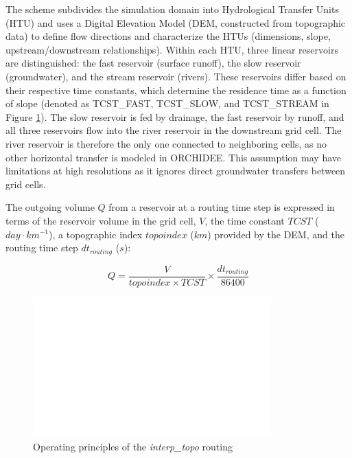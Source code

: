 The scheme subdivides the simulation domain into Hydrological Transfer Units (HTU) and uses a Digital Elevation Model (DEM, constructed from topographic data) to define flow directions and characterize the HTUs (dimensions, slope, upstream/downstream relationships).
Within each HTU, three linear reservoirs are distinguished: the fast reservoir (surface runoff), the slow reservoir (groundwater), and the stream reservoir (rivers). These reservoirs differ based on their respective time constants, which determine the residence time as a function of slope (denoted as TCST\_FAST, TCST\_SLOW, and TCST\_STREAM in Figure \ref{fig:routing_principles}).
The slow reservoir is fed by drainage, the fast reservoir by runoff, and all three reservoirs flow into the river reservoir in the downstream grid cell. The river reservoir is therefore the only one connected to neighboring cells, as no other horizontal transfer is modeled in ORCHIDEE. This assumption may have limitations at high resolutions as it ignores direct groundwater transfers between grid cells.

The outgoing volume $Q$ from a reservoir at a routing time step is expressed in terms of the reservoir volume in the grid cell, $V$, the time constant $TCST$ ($day \cdot km^{-1}$), a topographic index $topoindex$ ($km$) provided by the DEM, and the routing time step $dt_{routing}$ ($s$):

\begin{equation}
    Q = \frac{V}{topoindex \times TCST} \times \frac{dt_{routing}}{86400}
\end{equation}

\begin{figure}[ht]
    \centering
    \includegraphics[width=1\linewidth]{images/routing_structure.png}
    \caption{Operating principles of the \textit{interp\_topo} routing}
    \label{fig:routing_principles}
\end{figure}

